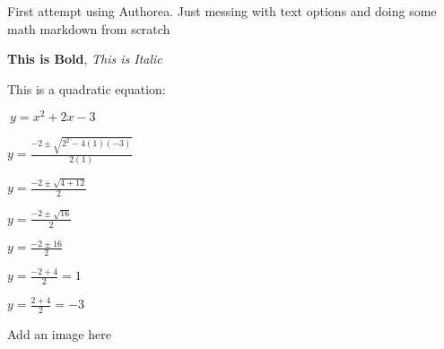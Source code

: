 First attempt using Authorea. Just messing with text options and doing some math markdown from scratch

\textbf{This is Bold}, \textit{This is Italic}

This is a quadratic equation:

$\ y = x^{2} + 2x -3 $


$ y = \frac{-2 \pm \sqrt{2^{2}-4(1)(-3)}}{2(1)}$

$ y = \frac{-2 \pm \sqrt{4+12}}{2}$

$ y = \frac{-2 \pm \sqrt{16}}{2}$

$ y = \frac{-2 \pm {16}}{2}$

$ y = \frac{-2 + {4}}{2} = 1$

$ y = \frac{2 + {4}}{2} = -3$


Add an image here 
